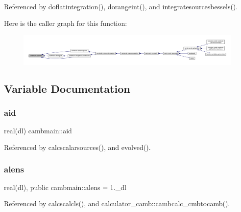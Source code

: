 Referenced by doflatintegration(), dorangeint(), and integratesourcesbessels().

Here is the caller graph for this function\+:
\nopagebreak
\begin{figure}[H]
\begin{center}
\leavevmode
\includegraphics[width=350pt]{namespacecambmain_ad1efd57b702656e463555cccd0f1b40c_icgraph}
\end{center}
\end{figure}


\subsection{Variable Documentation}
\mbox{\label{namespacecambmain_a75e3aaa48b8fb5985062a5be2f05dea8}} 
\subsubsection{\texorpdfstring{aid}{aid}}
{\footnotesize\ttfamily real(dl) cambmain\+::aid\hspace{0.3cm}{\ttfamily [private]}}



Referenced by calcscalarsources(), and evolved().

\mbox{\label{namespacecambmain_a5e84a7f00ba906908259607d54f9176f}} 
\subsubsection{\texorpdfstring{alens}{alens}}
{\footnotesize\ttfamily real(dl), public cambmain\+::alens = 1.\+\_\+dl}



Referenced by calcscalcls(), and calculator\+\_\+camb\+::cambcalc\+\_\+cmbtocamb().

\mbox{\label{namespacecambmain_a3a07a99a808d7449c0ca61a9df448594}} 
